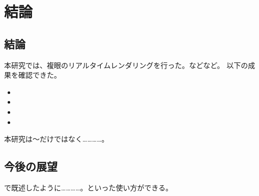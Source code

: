 \chapter{結論}
\label{CConclusion}

\section{結論}
\label{SConclusion}

本研究では、複眼のリアルタイムレンダリングを行った。などなど。
以下の成果を確認できた。

\begin{itemize}
\item 
\item 
\item 
\item 
\end{itemize}

本研究は～だけではなく…………。


\section{今後の展望}
\label{SFutureWork}

で既述したように…………。といった使い方ができる。

